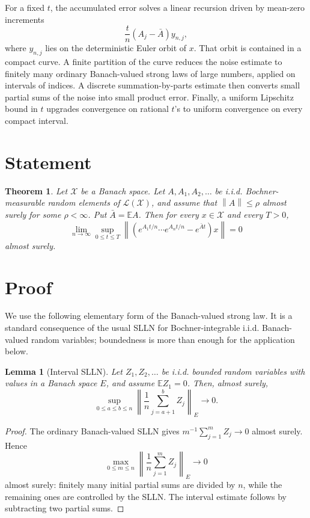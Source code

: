 \documentclass[11pt]{article}
\newtheorem{theorem}{Theorem}
\newtheorem{lemma}{Lemma}
\newcommand{\X}{\mathcal X}
\newcommand{\Lcal}{\mathcal L}
\newcommand{\EE}{\mathbb E}
\newcommand{\norm}[1]{\left\lVert #1\right\rVert}
\begin{document}
For a fixed \(t\), the accumulated error solves a linear recursion driven by
mean-zero increments
\[
  \frac{t}{n}(A_j-\bar A)y_{n,j},
\]
where \(y_{n,j}\) lies on the deterministic Euler orbit of \(x\).  That orbit
is contained in a compact curve.  A finite partition of the curve reduces the
noise estimate to finitely many ordinary Banach-valued strong laws of large
numbers, applied on intervals of indices.  A discrete summation-by-parts
estimate then converts small partial sums of the noise into small product
error.  Finally, a uniform Lipschitz bound in \(t\) upgrades convergence on
rational \(t\)'s to uniform convergence on every compact interval.

\section*{Statement}

\begin{theorem}
\label{thm:all-banach-slln}
Let \(\X\) be a Banach space. Let
\(A,A_1,A_2,\ldots\) be i.i.d. Bochner-measurable random elements of
\(\Lcal(\X)\), and assume that \(\norm{A}\le \rho\) almost surely for some
\(\rho<\infty\).  Put \(\bar A=\EE A\).  Then for every \(x\in \X\) and every
\(T>0\),
\[
  \lim_{n\to\infty}
  \sup_{0\le t\le T}
  \norm{\left(e^{A_1t/n}\cdots e^{A_nt/n}-e^{\bar A t}\right)x}
  =0
\]
almost surely.
\end{theorem}

\section*{Proof}

We use the following elementary form of the Banach-valued strong law.  It is a
standard consequence of the usual SLLN for Bochner-integrable i.i.d.
Banach-valued random variables; boundedness is more than enough for the
application below.

\begin{lemma}[Interval SLLN]
\label{lem:interval-slln}
Let \(Z_1,Z_2,\ldots\) be i.i.d. bounded random variables with values in a
Banach space \(E\), and assume \(\EE Z_1=0\).  Then, almost surely,
\[
  \sup_{0\le a\le b\le n}
  \norm{\frac1n\sum_{j=a+1}^{b} Z_j}_E \longrightarrow 0 .
\]
\end{lemma}

\begin{proof}
The ordinary Banach-valued SLLN gives
\(m^{-1}\sum_{j=1}^m Z_j\to0\) almost surely.  Hence
\[
  \max_{0\le m\le n}
  \norm{\frac1n\sum_{j=1}^{m}Z_j}_E\to0
\]
almost surely: finitely many initial partial sums are divided by \(n\), while
the remaining ones are controlled by the SLLN.  The interval estimate follows
by subtracting two partial sums.
\end{proof}
\end{document}
